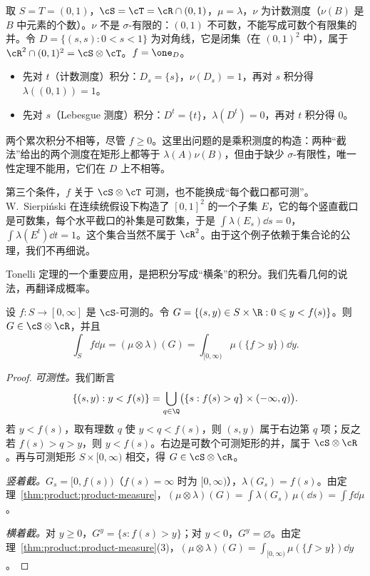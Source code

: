 \begin{example}\label{ex:product:not-sigma-finite}
取 $S=T=(0,1)$，$\cS=\cT=\cR\cap(0,1)$，$\mu=\lambda$，$\nu$ 为计数测度（$\nu(B)$ 是 $B$ 中元素的个数）。$\nu$ 不是 $\sigma$-有限的：$(0,1)$ 不可数，不能写成可数个有限集的并。令 $D=\{(s,s):0<s<1\}$ 为对角线，它是闭集（在 $(0,1)^2$ 中），属于 $\cR^2\cap(0,1)^2=\cS\otimes\cT$。$f=\one_D$。
\begin{itemize}
\item 先对 $t$（计数测度）积分：$D_s=\{s\}$，$\nu(D_s)=1$，再对 $s$ 积分得 $\lambda((0,1))=1$。
\item 先对 $s$（Lebesgue 测度）积分：$D^t=\{t\}$，$\lambda(D^t)=0$，再对 $t$ 积分得 $0$。
\end{itemize}
两个累次积分不相等，尽管 $f\geqslant0$。这里出问题的是乘积测度的构造：两种“截法”给出的两个测度在矩形上都等于 $\lambda(A)\nu(B)$，但由于缺少 $\sigma$-有限性，唯一性定理不能用，它们在 $D$ 上不相等。
\end{example}

\begin{remark}[可测性的条件★]
第三个条件，$f$ 关于 $\cS\otimes\cT$ 可测，也不能换成“每个截口都可测”。W.\ Sierpiński 在连续统假设下构造了 $[0,1]^2$ 的一个子集 $E$，它的每个竖直截口是可数集，每个水平截口的补集是可数集，于是 $\int\lambda(E_s)\dd s=0$，$\int\lambda(E^t)\dd t=1$。这个集合当然不属于 $\cR^2$。由于这个例子依赖于集合论的公理，我们不再细说。
\end{remark}


Tonelli 定理的一个重要应用，是把积分写成“横条”的积分。我们先看几何的说法，再翻译成概率。

\begin{proposition}[图像下方的面积]\label{prop:product:area-under-graph}
设 $f:S\to[0,\infty]$ 是 $\cS$-可测的。令 $G=\{(s,y)\in S\times\R:0\leqslant y<f(s)\}$。则 $G\in\cS\otimes\cR$，并且
\[
\int_Sf\dd\mu=(\mu\otimes\lambda)(G)=\int_{[0,\infty)}\mu(\{f>y\})\dd y .
\]
\end{proposition}
\begin{proof}
\emph{可测性。}我们断言
\[
\{(s,y):y<f(s)\}=\bigcup_{q\in\Q}\bigl(\{s:f(s)>q\}\times(-\infty,q)\bigr).
\]
若 $y<f(s)$，取有理数 $q$ 使 $y<q<f(s)$，则 $(s,y)$ 属于右边第 $q$ 项；反之若 $f(s)>q>y$，则 $y<f(s)$。右边是可数个可测矩形的并，属于 $\cS\otimes\cR$。再与可测矩形 $S\times[0,\infty)$ 相交，得 $G\in\cS\otimes\cR$。

\emph{竖着截。}$G_s=[0,f(s))$（$f(s)=\infty$ 时为 $[0,\infty)$），$\lambda(G_s)=f(s)$。由定理~\ref{thm:product:product-measure}，$(\mu\otimes\lambda)(G)=\int\lambda(G_s)\,\mu(\dd s)=\int f\dd\mu$。

\emph{横着截。}对 $y\geqslant0$，$G^y=\{s:f(s)>y\}$；对 $y<0$，$G^y=\varnothing$。由定理~\ref{thm:product:product-measure}(3)，$(\mu\otimes\lambda)(G)=\int_{[0,\infty)}\mu(\{f>y\})\dd y$。
\end{proof}

